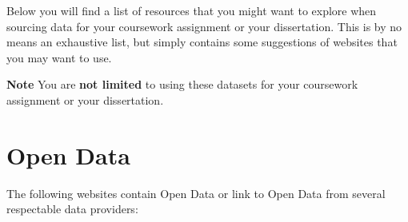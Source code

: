 \documentclass[
]{book}
\begin{document}
Below you will find a list of resources that you might want to explore when sourcing data for your coursework assignment or your dissertation. This is by no means an exhaustive list, but simply contains some suggestions of websites that you may want to use.

\textbf{Note}
You are \textbf{not limited} to using these datasets for your coursework assignment or your dissertation.

\hypertarget{open-data}{%
\section{Open Data}\label{open-data}}

The following websites contain Open Data or link to Open Data from several respectable data providers:
\end{document}
